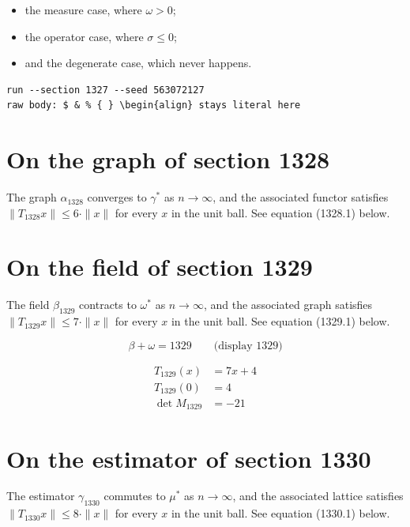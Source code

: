 \documentclass{article}
\begin{document}
\begin{itemize}
  \item the measure case, where $\omega > 0$;
  \item the operator case, where $\sigma \leq 0$;
  \item and the degenerate case, which never happens.
\end{itemize}

\begin{verbatim}
run --section 1327 --seed 563072127
raw body: $ & % { } \begin{align} stays literal here
\end{verbatim}

\section{On the graph of section 1328}
The graph $\alpha_{1328}$ converges to $\gamma^{*}$ as $n \to \infty$,
and the associated functor satisfies $\|T_{1328} x\| \leq 6 \cdot \|x\|$
for every $x$ in the unit ball. See equation (1328.1) below.

\section{On the field of section 1329}
The field $\beta_{1329}$ contracts to $\omega^{*}$ as $n \to \infty$,
and the associated graph satisfies $\|T_{1329} x\| \leq 7 \cdot \|x\|$
for every $x$ in the unit ball. See equation (1329.1) below.

$$
\beta + \omega = 1329 \qquad \text{(display 1329)}
$$

\begin{align}
T_{1329}(x) &= 7 x + 4 \\
T_{1329}(0) &= 4 \\
\det M_{1329} &= -21
\end{align}

\section{On the estimator of section 1330}
The estimator $\gamma_{1330}$ commutes to $\mu^{*}$ as $n \to \infty$,
and the associated lattice satisfies $\|T_{1330} x\| \leq 8 \cdot \|x\|$
for every $x$ in the unit ball. See equation (1330.1) below.
\end{document}
